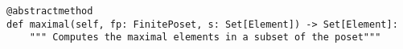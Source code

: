 \par\begin{minipage}{68ex}
\begin{verbatim}
@abstractmethod
def maximal(self, fp: FinitePoset, s: Set[Element]) -> Set[Element]:
    """ Computes the maximal elements in a subset of the poset"""
\end{verbatim}
\end{minipage}\par